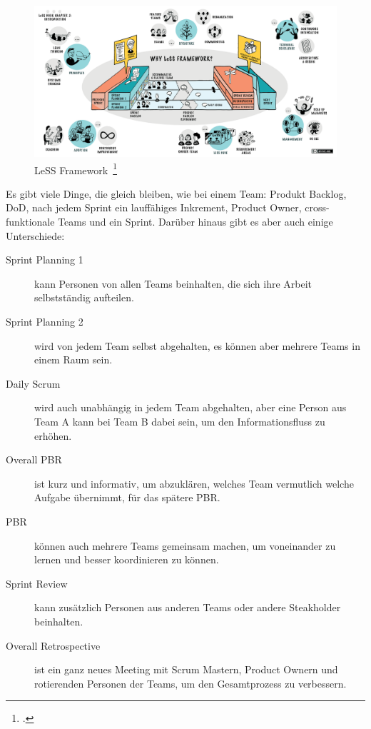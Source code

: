 \begin{savenotes}
  \begin{figure}[H] 
    \centering
       \includegraphics[width=1.0\textwidth]{img/less.png}
    \caption[\ac{LeSS} Framework]{\ac{LeSS} Framework~\footcite{less_framework}}\label{fig:less}
  \end{figure}
\end{savenotes}

Es gibt viele Dinge, die gleich bleiben, wie bei einem Team: Produkt Backlog, \ac{DoD}, nach jedem Sprint ein lauffähiges Inkrement, Product Owner, cross-funktionale Teams und ein Sprint.
Darüber hinaus gibt es aber auch einige Unterschiede:

\begin{description}
  \item[Sprint Planning 1] kann Personen von allen Teams beinhalten, die sich ihre Arbeit selbstständig aufteilen.
  \item[Sprint Planning 2] wird von jedem Team selbst abgehalten, es können aber mehrere Teams in einem Raum sein.
  \item[Daily Scrum] wird auch unabhängig in jedem Team abgehalten, aber eine Person aus Team A kann bei Team B dabei sein, um den Informationsfluss zu erhöhen.
  \item[Overall \ac{PBR}] ist kurz und informativ, um abzuklären, welches Team vermutlich welche Aufgabe übernimmt, für das spätere \ac{PBR}.
  \item[\ac{PBR}] können auch mehrere Teams gemeinsam machen, um voneinander zu lernen und besser koordinieren zu können.
  \item[Sprint Review] kann zusätzlich Personen aus anderen Teams oder andere Steakholder beinhalten.
  \item[Overall Retrospective] ist ein ganz neues Meeting mit Scrum Mastern, Product Ownern und rotierenden Personen der Teams, um den Gesamtprozess zu verbessern.
\end{description}

